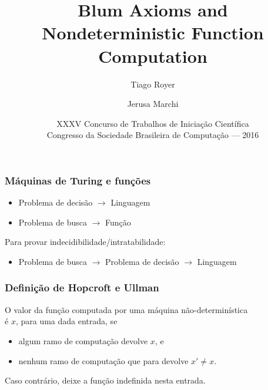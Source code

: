 \documentclass[utf8,notheorems]{beamer}
\theoremstyle{definition}
\begin{document}
\title{Blum Axioms and Nondeterministic Function Computation}
\author{Tiago Royer \and Jerusa Marchi}
\date[XXXV CTIC]{
    XXXV Concurso de Trabalhos de Iniciação Científica \\
    Congresso da Sociedade Brasileira de Computação --- 2016
}

\begin{frame}
    \titlepage
\end{frame}

\begin{frame}
    \frametitle{Máquinas de Turing e funções}
    \begin{itemize}
        \item Problema de decisão $\rightarrow$ Linguagem
        \item Problema de busca $\rightarrow$ Função
    \end{itemize}

    Para provar indecidibilidade/intratabilidade:
    \begin{itemize}
        \item Problema de busca $\rightarrow$ Problema de decisão
            $\rightarrow$ Linguagem
    \end{itemize}
\end{frame}

\begin{frame}
    \frametitle{Definição de Hopcroft e Ullman}
    O valor da função computada por uma máquina não-determinística \\
    é $x$, para uma dada entrada, se
    \begin{itemize}
        \item algum ramo de computação devolve $x$, e
        \item nenhum ramo de computação que para devolve $x' \neq x$.
    \end{itemize}
    Caso contrário, deixe a função indefinida nesta entrada.
    \cite[p.~313]{HopcroftUllman1979}
\end{frame}
\end{document}
